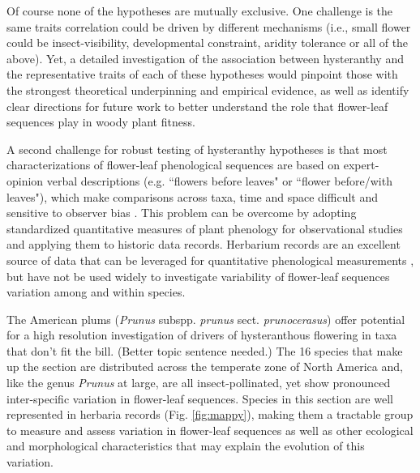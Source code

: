 \documentclass{article}[11pt]
\begin{document}
Of course none of the hypotheses are mutually exclusive. One challenge is the same traits correlation could be driven by different mechanisms (i.e., small flower could be insect-visibility, developmental constraint, aridity tolerance or all of the above). Yet, a detailed investigation of the association between hysteranthy and the representative traits of each of these hypotheses would pinpoint those with the strongest theoretical underpinning and empirical evidence, as well as identify clear directions for future work to better understand the role that flower-leaf sequences play in woody plant fitness.


\noindent A second challenge for robust testing of hysteranthy hypotheses is that most characterizations of flower-leaf phenological sequences are based on expert-opinion verbal descriptions (e.g. ``flowers before leaves" or ``flower before/with leaves"), which make comparisons across taxa, time and space difficult and sensitive to observer bias  \citep[see;][]{Buonaiuto2020}. This problem can be overcome by adopting standardized quantitative measures of plant phenology for observational studies and applying them to historic data records. Herbarium records are an excellent source of data that can be leveraged for quantitative phenological measurements \citep{Willis2017}, but have not be used widely to investigate variability of flower-leaf sequences variation among and within species.



The American plums (\textit{Prunus} subspp. \textit{prunus} sect. \textit{prunocerasus}) offer potential for a high resolution investigation of drivers of hysteranthous flowering in taxa that don't fit the bill. (Better topic sentence needed.) The 16 species that make up the section are distributed across the temperate zone of North America and, like the genus \textit{Prunus} at large, are all insect-pollinated, yet show pronounced inter-specific variation in flower-leaf sequences.  Species in this section are well represented in herbaria records (Fig. \ref{fig:mappy}), making them a tractable group to measure and assess variation in flower-leaf sequences as well as other ecological and morphological characteristics that may explain the evolution of this variation. 
\end{document}
